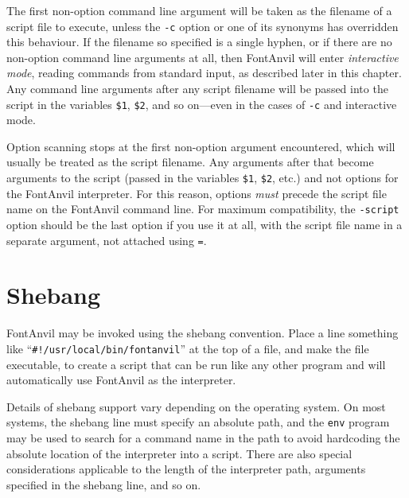 \documentclass[11pt]{report}
\begin{document}
The first non-option command line argument will be taken as the filename of
a script file to execute, unless the \texttt{-c} option or one of its
synonyms has overridden this behaviour.  If the filename so specified is a
single hyphen, or if there are no non-option command line arguments
at all, then FontAnvil will enter \emph{interactive mode}, reading
commands from standard input, as described later in this chapter.  Any
command line arguments after any script filename will be passed
into the script in the variables \texttt{\$1},
\texttt{\$2}, and so on---even in the cases of \texttt{-c} and interactive
mode.

\begin{framed}
Option scanning stops at the first non-option argument encountered, which
will usually be treated as the script filename.  Any arguments after that
become arguments to the script (passed in the variables \texttt{\$1},
\texttt{\$2}, etc.) and not options for the FontAnvil interpreter.  For this
reason, options \emph{must} precede the script file name on the FontAnvil
command line.  For maximum compatibility, the \texttt{-script} option should
be the last option if you use it at all, with the script file name in a
separate argument, not attached using \texttt{=}.
\end{framed}

\section{Shebang}

FontAnvil may be invoked using the shebang convention.  Place a line
something like ``\texttt{\#!/usr/local/bin/fontanvil}'' at the top of a
file, and make the file executable, to create a script that can be run like
any other program and will automatically use FontAnvil as the interpreter.

Details of shebang support vary depending on the operating system.  On most
systems, the shebang line must specify an absolute path, and the
\texttt{env} program may be used to search for a command name in the path to
avoid hardcoding the absolute location of the interpreter into a script. 
There are also special considerations applicable to the length of the
interpreter path, arguments specified in the shebang line, and so on. 
\end{document}
